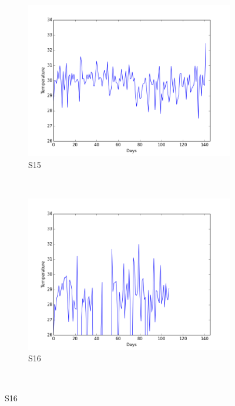 \documentclass[12pt]{article} %
\begin{document}
\begin{figure}[H]
    \begin{subfigure}[b]{0.30\textwidth}
        \includegraphics[width=\textwidth]{img/graphs/15-airtemp-1}
        \caption{S15}
        \label{fig:s15AT}
    \end{subfigure}
    ~ %
    \begin{subfigure}[b]{0.30\textwidth}
        \includegraphics[width=\textwidth]{img/graphs/16-airtemp-1}
        \caption{S16}
        \label{fig:s16AT}
    \end{subfigure}
    ~ %

\end{figure}
\end{document}
